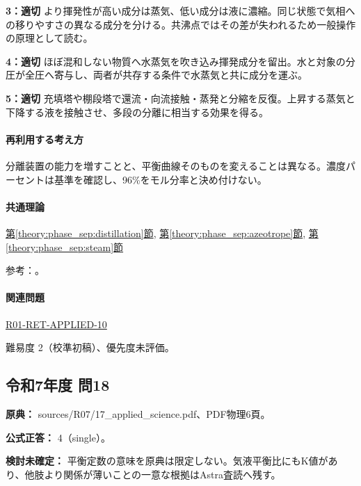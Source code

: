 \noindent\textbf{3：適切} より揮発性が高い成分は蒸気、低い成分は液に濃縮。同じ状態で気相への移りやすさの異なる成分を分ける。共沸点ではその差が失われるため一般操作の原理として読む。\par

\noindent\textbf{4：適切} ほぼ混和しない物質へ水蒸気を吹き込み揮発成分を留出。水と対象の分圧が全圧へ寄与し、両者が共存する条件で水蒸気と共に成分を運ぶ。\par

\noindent\textbf{5：適切} 充填塔や棚段塔で還流・向流接触・蒸発と分縮を反復。上昇する蒸気と下降する液を接触させ、多段の分離に相当する効果を得る。\par

\paragraph{再利用する考え方} 分離装置の能力を増すことと、平衡曲線そのものを変えることは異なる。濃度パーセントは基準を確認し、96\%をモル分率と決め付けない。

\paragraph{共通理論} \hyperref[theory:phase_sep:distillation]{第\ref*{theory:phase_sep:distillation}節}, \hyperref[theory:phase_sep:azeotrope]{第\ref*{theory:phase_sep:azeotrope}節}, \hyperref[theory:phase_sep:steam]{第\ref*{theory:phase_sep:steam}節}

\par 参考：\cite{nptel_distillation1,nptel_azeotrope}。

\paragraph{関連問題} \hyperref[q:r01-ret-applied-10]{R01-RET-APPLIED-10}

\par 難易度 2（校準初稿）、優先度未評価。

\subsection{令和7年度 問18}
\label{q:r07-reg-applied-18}

\noindent\textbf{原典：} sources/R07/17\_applied\_science.pdf、PDF物理6頁。

\textbf{公式正答：} 4（single）。

\par\textbf{検討未確定：} 平衡定数の意味を原典は限定しない。気液平衡比にもK値があり、他肢より関係が薄いことの一意な根拠はAstra査読へ残す。

